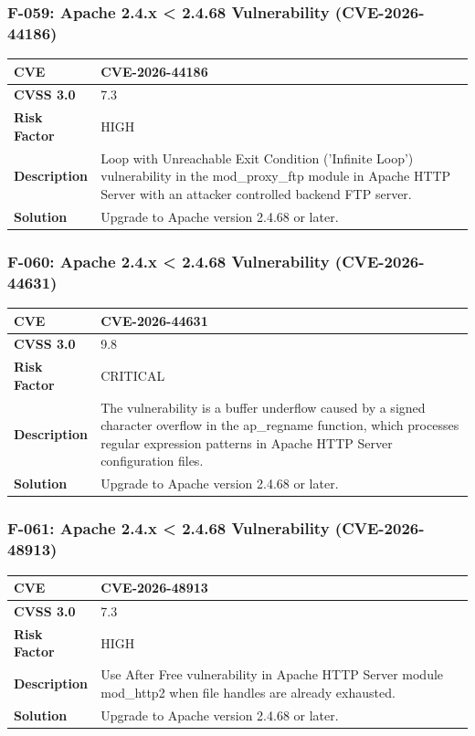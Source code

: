 \subsubsection{F-059: Apache 2.4.x < 2.4.68 Vulnerability (CVE-2026-44186)}
\begin{tabular}{|p{2.8cm}|p{12.2cm}|}
\hline
\textbf{CVE} & CVE-2026-44186 \\ \hline
\textbf{CVSS 3.0} & 7.3 \\ \hline
\textbf{Risk Factor} & HIGH \\ \hline
\textbf{Description} & Loop with Unreachable Exit Condition ('Infinite Loop') vulnerability in the mod\_proxy\_ftp module in Apache HTTP Server with an attacker controlled backend FTP server. \\ \hline
\textbf{Solution} & Upgrade to Apache version 2.4.68 or later. \\ \hline
\end{tabular}

\subsubsection{F-060: Apache 2.4.x < 2.4.68 Vulnerability (CVE-2026-44631)}
\begin{tabular}{|p{2.8cm}|p{12.2cm}|}
\hline
\textbf{CVE} & CVE-2026-44631 \\ \hline
\textbf{CVSS 3.0} & 9.8 \\ \hline
\textbf{Risk Factor} & CRITICAL \\ \hline
\textbf{Description} & The vulnerability is a buffer underflow caused by a signed character overflow in the ap\_regname function, which processes regular expression patterns in Apache HTTP Server configuration files. \\ \hline
\textbf{Solution} & Upgrade to Apache version 2.4.68 or later. \\ \hline
\end{tabular}

\subsubsection{F-061: Apache 2.4.x < 2.4.68 Vulnerability (CVE-2026-48913)}
\begin{tabular}{|p{2.8cm}|p{12.2cm}|}
\hline
\textbf{CVE} & CVE-2026-48913 \\ \hline
\textbf{CVSS 3.0} & 7.3 \\ \hline
\textbf{Risk Factor} & HIGH \\ \hline
\textbf{Description} & Use After Free vulnerability in Apache HTTP Server module mod\_http2 when file handles are already exhausted. \\ \hline
\textbf{Solution} & Upgrade to Apache version 2.4.68 or later. \\ \hline
\end{tabular}

